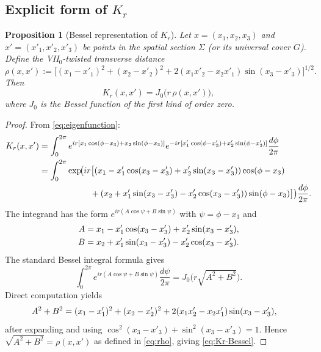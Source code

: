 \documentclass[12pt, a4paper]{article}
\newtheorem{proposition}[theorem]{Proposition}
\theoremstyle{remark}
\begin{document}
\subsection{Explicit form of $K_r$}

\begin{proposition}[Bessel representation of $K_r$]\label{prop:Bessel}
  Let $x = (x_1,x_2,x_3)$ and $x' = (x'_1,x'_2,x'_3)$ be points in
  the spatial section $\Sigma$ (or its universal cover $G$).
  Define the \emph{VII$_0$-twisted transverse distance}
  \begin{equation}\label{eq:rho}
    \rho(x,x') := \bigl[(x_1-x'_1)^2 + (x_2-x'_2)^2
      + 2(x_1 x'_2 - x_2 x'_1)\sin(x_3 - x'_3)\bigr]^{1/2}.
  \end{equation}
  Then
  \begin{equation}\label{eq:Kr-Bessel}
    K_r(x, x') = J_0\!\bigl(r\,\rho(x,x')\bigr),
  \end{equation}
  where $J_0$ is the Bessel function of the first kind of order zero.
\end{proposition}

\begin{proof}
  From \eqref{eq:eigenfunction}:
  \begin{align}
    K_r(x,x')
    &= \int_0^{2\pi} e^{ir[x_1\cos(\phi-x_3)+x_2\sin(\phi-x_3)]}
       e^{-ir[x'_1\cos(\phi-x'_3)+x'_2\sin(\phi-x'_3)]}
       \frac{d\phi}{2\pi} \notag\\
    &= \int_0^{2\pi}
       \exp\!\bigl(ir\bigl[(x_1-x'_1\cos(x_3-x'_3)+x'_2\sin(x_3-x'_3))
             \cos(\phi-x_3) \notag\\
    &\qquad\qquad\qquad
             + (x_2+x'_1\sin(x_3-x'_3)-x'_2\cos(x_3-x'_3))
             \sin(\phi-x_3)\bigr]\bigr)
       \frac{d\phi}{2\pi}.
  \end{align}
  The integrand has the form $e^{i r(A\cos\psi + B\sin\psi)}$ with
  $\psi = \phi - x_3$ and
  \begin{align}
    A &= x_1 - x'_1\cos(x_3-x'_3) + x'_2\sin(x_3-x'_3), \notag\\
    B &= x_2 + x'_1\sin(x_3-x'_3) - x'_2\cos(x_3-x'_3).
  \end{align}
  The standard Bessel integral formula gives
  \begin{equation}
    \int_0^{2\pi} e^{i r(A\cos\psi + B\sin\psi)}\frac{d\psi}{2\pi}
      = J_0\!\bigl(r\sqrt{A^2+B^2}\bigr).
  \end{equation}
  Direct computation yields
  \begin{align}
    A^2 + B^2
    &= (x_1-x'_1)^2 + (x_2-x'_2)^2
       + 2(x_1 x'_2 - x_2 x'_1)\sin(x_3-x'_3), \notag
  \end{align}
  after expanding and using $\cos^2(x_3-x'_3)+\sin^2(x_3-x'_3)=1$.
  Hence $\sqrt{A^2+B^2} = \rho(x,x')$ as defined in \eqref{eq:rho},
  giving \eqref{eq:Kr-Bessel}.
\end{proof}
\end{document}
